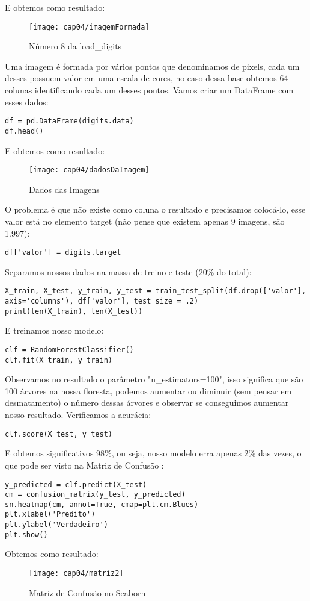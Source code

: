 E obtemos como resultado:
\begin{figure}[H]
	\centering
	\texttt{[image: cap04/imagemFormada]}
	\caption{Número 8 da load\_digits}
\end{figure}

Uma imagem é formada por vários pontos que denominamos de pixels, cada um desses possuem valor em uma escala de cores, no caso dessa base obtemos 64 colunas identificando cada um desses pontos. Vamos criar um DataFrame com esses dados:
\begin{lstlisting}[]
df = pd.DataFrame(digits.data)
df.head()
\end{lstlisting}

E obtemos como resultado:
\begin{figure}[H]
	\centering
	\texttt{[image: cap04/dadosDaImagem]}
	\caption{Dados das Imagens}
\end{figure}

O problema é que não existe como coluna o resultado e precisamos colocá-lo, esse valor está no elemento target (não pense que existem apenas 9 imagens, são 1.997):
\begin{lstlisting}[]
df['valor'] = digits.target
\end{lstlisting}

Separamos nossos dados na massa de treino e teste (20\% do total):
\begin{lstlisting}[]
X_train, X_test, y_train, y_test = train_test_split(df.drop(['valor'], axis='columns'), df['valor'], test_size = .2)
print(len(X_train), len(X_test))
\end{lstlisting}

E treinamos nosso modelo:
\begin{lstlisting}[]
clf = RandomForestClassifier()
clf.fit(X_train, y_train)
\end{lstlisting}

Observamos no resultado o parâmetro "n\_estimators=100", isso significa que são 100 árvores na nossa floresta, podemos aumentar ou diminuir (sem pensar em desmatamento) o número dessas árvores e observar se conseguimos aumentar nosso resultado. Verificamos a acurácia:
\begin{lstlisting}[]
clf.score(X_test, y_test)
\end{lstlisting}

E obtemos significativos 98\%, ou seja, nosso modelo erra apenas 2\% das vezes, o que pode ser visto na Matriz de Confusão :
\begin{lstlisting}[]
y_predicted = clf.predict(X_test)
cm = confusion_matrix(y_test, y_predicted)
sn.heatmap(cm, annot=True, cmap=plt.cm.Blues)
plt.xlabel('Predito')
plt.ylabel('Verdadeiro')
plt.show()
\end{lstlisting}

Obtemos como resultado:
\begin{figure}[H]
	\centering
	\texttt{[image: cap04/matriz2]}
	\caption{Matriz de Confusão no Seaborn}
\end{figure}

\clearpage
